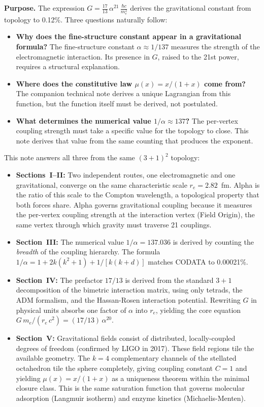 \documentclass[11pt]{article}
\begin{document}
\textbf{Purpose.}\quad
The expression $G = \frac{17}{13}\,\alpha^{21}\,\frac{\hbar c}{m_e^2}$ derives the gravitational constant from topology to 0.12\%.
Three questions naturally follow:
%
\begin{itemize}[nosep,leftmargin=2em]
\item \textbf{Why does the fine-structure constant appear in a gravitational formula?}
The fine-structure constant $\alpha \approx 1/137$ measures the strength of the electromagnetic interaction. Its presence in $G$, raised to the 21st power, requires a structural explanation.
\item \textbf{Where does the constitutive law $\mu(x) = x/(1+x)$ come from?}
The companion technical note derives a unique Lagrangian from this function, but the function itself must be derived, not postulated.
\item \textbf{What determines the numerical value $1/\alpha \approx 137$?}
The per-vertex coupling strength must take a specific value for the topology to close. This note derives that value from the same counting that produces the exponent.
\end{itemize}
%
This note answers all three from the same $(3+1)^2$ topology:
%
\begin{itemize}[nosep,leftmargin=2em]
\item \textbf{Sections~I--II:} Two independent routes, one electromagnetic and one gravitational, converge on the same characteristic scale $r_e = 2.82$~fm.
Alpha is the ratio of this scale to the Compton wavelength, a topological property that both forces share.
Alpha governs gravitational coupling because it measures the per-vertex coupling strength at the interaction vertex (Field Origin), the same vertex through which gravity must traverse 21 couplings.
\item \textbf{Section~III:} The numerical value $1/\alpha = 137.036$ is derived by counting the \emph{breadth} of the coupling hierarchy.
The formula $1/\alpha = 1 + 2k(k^2 + 1) + 1/[k(k+d)]$ matches CODATA to 0.00021\%.
\item \textbf{Section~IV:} The prefactor $17/13$ is derived from the standard $3+1$ decomposition of the bimetric interaction matrix, using only tetrads, the ADM formalism, and the Hassan-Rosen interaction potential.
Rewriting $G$ in physical units absorbs one factor of $\alpha$ into $r_e$, yielding the core equation $G\,m_e/(r_e\,c^2) = (17/13)\,\alpha^{20}$.
\item \textbf{Section~V:} Gravitational fields consist of distributed, locally-coupled degrees of freedom (confirmed by LIGO in 2017).
These field regions tile the available geometry.
The $k = 4$ complementary channels of the stellated octahedron tile the sphere completely, giving coupling constant $C = 1$ and yielding $\mu(x) = x/(1+x)$ as a uniqueness theorem within the minimal closure class.
This is the same saturation function that governs molecular adsorption (Langmuir isotherm) and enzyme kinetics (Michaelis-Menten).
\end{itemize}
\end{document}
